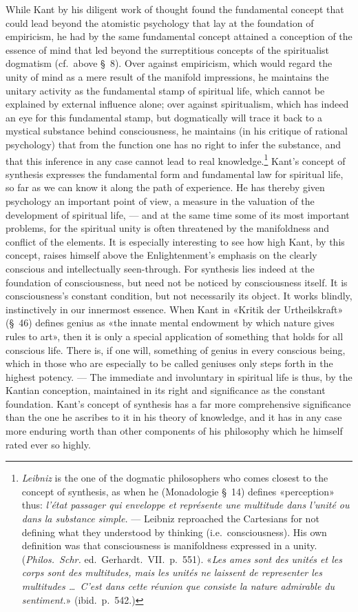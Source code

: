 \documentclass[12pt,a4paper]{article}
\newcommand{\opage}[1]{\marginnote{\footnotesize\textit{[#1]}}}
\begin{document}
While Kant by his diligent work of thought found the fundamental concept that
could lead beyond the atomistic psychology that lay at the foundation of
empiricism, he had by the same fundamental concept attained a conception of
the essence of mind that led beyond the surreptitious concepts of the
spiritualist dogmatism (cf.\ above §\ 8). Over against empiricism, which would
regard the unity of mind as a mere result of the manifold impressions, he
maintains the unitary activity as the fundamental stamp of spiritual life,
which cannot be explained by external influence alone; over against
spiritualism, which has indeed an eye for this fundamental stamp, but
dogmatically will trace it back to a mystical substance behind consciousness,
he maintains (in his critique of rational psychology) that from the function
one has no right to infer the substance, and that this inference in any case
cannot lead to real knowledge.\footnote{\emph{Leibniz} is the one of the dogmatic
philosophers who comes closest to the concept of synthesis, as when he
(Monadologie §\ 14) defines «perception» thus: \textit{l'état passager qui
enveloppe et représente une multitude dans l'unité ou dans la substance
simple.} --- Leibniz reproached the Cartesians for not defining what they
understood by thinking (i.e.\ consciousness). His own definition was that
consciousness is manifoldness expressed in a unity. (\textit{Philos.\ Schr.}
ed.\ Gerhardt.\ VII.\ p.\ 551). «\textit{Les ames sont des unités et les
corps sont des multitudes, mais les unités ne laissent de representer les
multitudes \ldots\ C'est dans cette \emph{réunion} que consiste la nature admirable
du sentiment.}» (ibid.\ p.\ 542.)} Kant's concept of synthesis expresses the
fundamental form and fundamental law for spiritual life, so far as we can \opage{58}know
it along the path of experience. He has thereby given psychology an important
point of view, a measure in the valuation of the development of spiritual
life, --- and at the same time some of its most important problems, for the
spiritual unity is often threatened by the manifoldness and conflict of the
elements. It is especially interesting to see how high Kant, by this concept,
raises himself above the Enlightenment's emphasis on the clearly conscious and
intellectually seen-through. For synthesis lies indeed at the foundation of
consciousness, but need not be noticed by consciousness itself. It is
consciousness's constant condition, but not necessarily its object. It works
blindly, instinctively in our innermost essence. When Kant in «Kritik der
Urtheilskraft» (§\ 46) defines genius as «the innate mental endowment by which
nature gives rules to art», then it is only a special application of something
that holds for all conscious life. There is, if one will, something of genius
in every conscious being, which in those who are especially to be called
geniuses only steps forth in the highest potency. --- The immediate and
involuntary in spiritual life is thus, by the Kantian conception, maintained
in its right and significance as the constant foundation. Kant's concept of
synthesis has a far more comprehensive significance than the one he ascribes
to it in his theory of knowledge, and it has in any case more enduring worth
than other components of his philosophy which he himself rated ever so highly.
\end{document}
